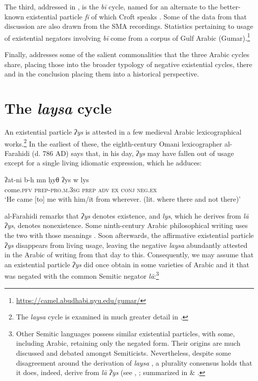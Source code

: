 \documentclass[output=paper,colorlinks,citecolor=brown]{langscibook}
\begin{document}
The third, addressed in , is the \textit{bī} cycle, named for an alternate to the better-known existential particle \textit{fī} of which Croft speaks \citeyearpar[7]{Croft1991}. Some of the data from that discussion are also drawn from the SMA recordings. Statistics pertaining to usage of existential negators involving \textit{bī} come from a corpus of Gulf Arabic (Gumar).\footnote{\url{https://camel.abudhabi.nyu.edu/gumar/}}

Finally,  addresses some of the salient commonalities that the three Arabic cycles share, placing those into the broader typology of negative existential cycles, there and in the conclusion placing them into a historical perspective.

\section{The \textit{laysa} cycle}
\label{s:WiAR-2}
An existential particle \textit{ʔys} is attested in a few medieval Arabic lexicographical works.\footnote{The \textit{laysa} cycle is examined in much greater detail in \citet{wilmsen2016a}.} In the earliest of these, the eighth-century Omani lexicographer al-Fara\-hi\-di (d. 786 AD) says that, in his day, \textit{ʔys} may have fallen out of usage except for a single living idiomatic expression, which he adduces:

\ea \label{ex:WiAR-1}
	\gll ʔat-ni b-h mn ḥyθ ʔys w lys \\
	come.\textsc{pfv} \textsc{prep-pro.m.3sg} \textsc{prep} \textsc{adv} \textsc{ex} \textsc{conj} \textsc{neg.ex}\\
	\glt `He came [to] me with him/it from wherever. (lit. where there and not there)' \citep[105]{al-far2003a}
\z

al-Farahidi remarks that \textit{ʔys} denotes existence, and \textit{lys}, which he derives from \textit{lā ʔys}, denotes nonexistence. Some ninth-century Arabic philosophical writing uses the two with those meanings \citep[35]{gihami-a}. Soon afterwards, the affirmative existential particle \textit{ʔys} disappears from living usage, leaving the negative \textit{laysa} abundantly attested in the Arabic of writing from that day to this. Consequently, we may assume that an existential particle \textit{ʔys} did once obtain in some varieties of Arabic and it that was negated with the common Semitic negator \textit{lā}:\footnote{Other Semitic languages possess similar existential particles, with some, including Arabic, retaining only the negated form. Their origins are much discussed and debated amongst Semiticists. Nevertheless, despite some disagreement around the derivation of \textit{laysa} \citep{wilmsen2016a, al-jallad2018a}, a plurality consensus holds that it does, indeed, derive from \textit{lā ʔys} (see \citet{blau1972a, gensler2000a}, \citet[464--465, 488--489]{lipi2001a}; summarized in \citet[329--331]{wilmsen2016a} \& \citet[298--299]{wilmsen2017a}.}
\end{document}
